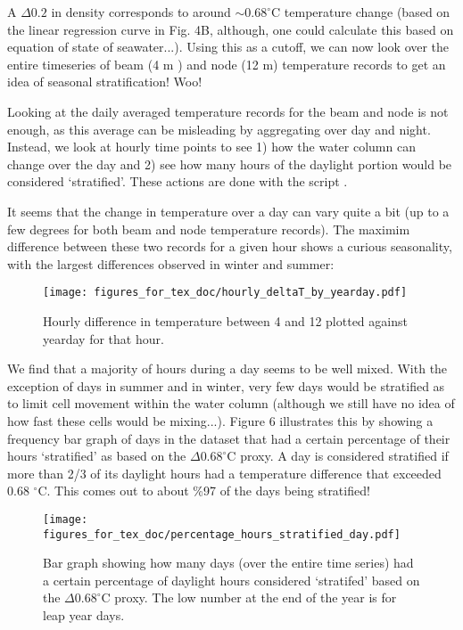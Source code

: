 \documentclass[11pt]{article}
\begin{document}
\clearpage
\noindent A $\Delta0.2$ in density corresponds to around $\sim0.68 ^{\circ}$C temperature change (based on the linear regression curve in Fig. 4B, although, one could calculate this based on equation of state of seawater...). Using this as a cutoff, we can now look over the entire timeseries of beam (4 m ) and node (12 m) temperature records to get an idea of seasonal stratification! Woo!

Looking at the daily averaged temperature records for the beam and node is not enough, as this average can be misleading by aggregating over day and night. Instead, we look at hourly time points to see 1) how the water column can change over the day and 2) see how many hours of the daylight portion would be considered `stratified'. These actions are done with the script .

It seems that the change in temperature over a day can vary quite a bit (up to a few degrees for both beam and node temperature records). The maximim difference between these two records for a given hour shows a curious seasonality, with the largest differences observed in winter and summer:

 \begin{figure}[h]
\centering
\texttt{[image: figures\_for\_tex\_doc/hourly\_deltaT\_by\_yearday.pdf]}
\caption{Hourly difference in temperature between 4 and 12 plotted against yearday for that hour.}
\end{figure}

We find that a majority of hours during a day seems to be well mixed. With the exception of days in summer and in winter, very few days would be stratified as to limit cell movement within the water column (although we still have no idea of how fast these cells would be mixing...).  Figure 6 illustrates this by showing a frequency bar graph of days in the dataset that had a certain percentage of their hours `stratified' as based on the $\Delta0.68 ^{\circ}$C proxy. A day is considered stratified if more than 2/3 of its daylight hours had a temperature difference that exceeded 0.68 $^{\circ}$C. This comes out to about \%97 of the days being stratified!

 \begin{figure}[h]
\centering
\texttt{[image: figures\_for\_tex\_doc/percentage\_hours\_stratified\_day.pdf]}
\caption{Bar graph showing how many days  (over the entire time series) had a certain percentage of daylight hours considered `stratifed' based on the $\Delta0.68 ^{\circ}$C proxy. The low number at the end of the year is for leap year days.}
\end{figure}
\end{document}
